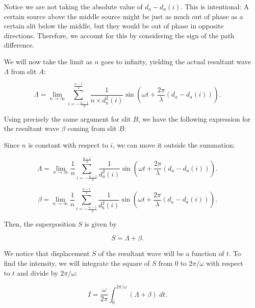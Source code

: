 \documentclass{paper}
\begin{document}
Notice we are not taking the absolute value of $d_a - d_a(i)$. This is intentional: A certain source above the middle source might be just as much out of phase as a certain slit below the middle, but they would be out of phase in opposite directions. Therefore, we account for this by considering the sign of the path difference.

We will now take the limit as $n$ goes to infinity, yielding the actual resultant wave $\Lambda$ from slit $A$:

\begin{equation*}
    \Lambda = \lim_{n \to \infty} \sum_{i = -\frac{n - 1}{2}}^{\frac{n - 1}{2}} \frac{1}{n \times d_a^2(i)} \sin\left(\omega t + \frac{2\pi}{\lambda}(d_a - d_a(i))\right).
\end{equation*}

Using precisely the same argument for slit $B$, we have the following expression for the resultant wave $\beta$ coming from slit $B$:

Since $n$ is constant with respect to $i$, we can move it outside the summation:

\begin{equation*}
        \Lambda = \lim_{n \to \infty} \frac{1}{n}\sum_{i = -\frac{n - 1}{2}}^{\frac{n - 1}{2}} \frac{1}{ d_a^2(i)} \sin\left(\omega t + \frac{2\pi}{\lambda}(d_a - d_a(i))\right).
\end{equation*}

\begin{equation*}
    \beta = \lim_{n \to \infty} \frac{1}{n}\sum_{i = -\frac{n - 1}{2}}^{\frac{n - 1}{2}} \frac{1}{d_b^2(i)} \sin\left(\omega t + \frac{2\pi}{\lambda}(d_a - d_a(i))\right).
\end{equation*}

Then, the superposition $S$ is given by

\begin{equation*}
    S = \Lambda + \beta.
\end{equation*}

We notice that displacement $S$ of the resultant wave will be a function of $t$. To find the intensity, we will integrate the square of $S$ from $0$ to $2\pi / \omega$ with respect to $t$ and divide by $2\pi / \omega$:

\begin{equation*}
    I = \frac{\omega}{2\pi}\int_{0}^{2\pi / \omega} (\Lambda + \beta) \; dt.
\end{equation*}

\pagebreak
\end{document}
